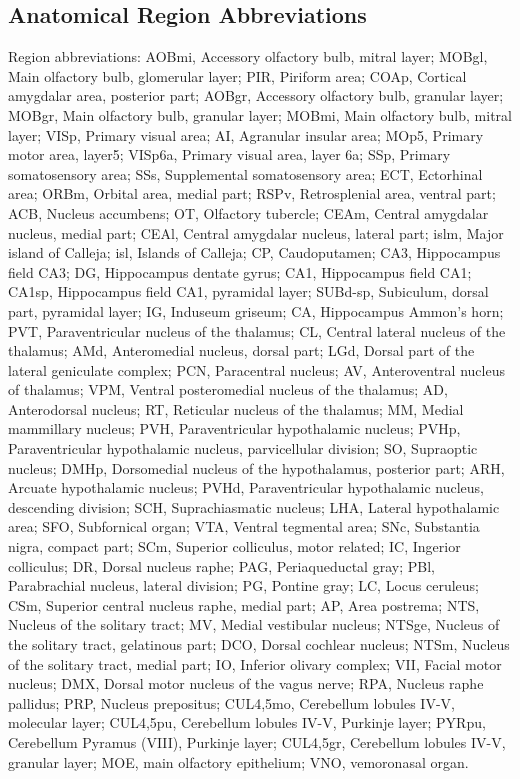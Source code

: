 \subsection{Anatomical Region Abbreviations}
Region abbreviations: AOBmi, Accessory olfactory bulb, mitral layer; MOBgl, Main olfactory bulb, glomerular layer; PIR, Piriform area; COAp, Cortical amygdalar area, posterior part; AOBgr, Accessory olfactory bulb, granular layer; MOBgr, Main olfactory bulb, granular layer; MOBmi, Main olfactory bulb, mitral layer; VISp, Primary visual area; AI, Agranular insular area; MOp5, Primary motor area, layer5; VISp6a, Primary visual area, layer 6a; SSp, Primary somatosensory area; SSs, Supplemental somatosensory area; ECT, Ectorhinal area; ORBm, Orbital area, medial part; RSPv, Retrosplenial area, ventral part; ACB, Nucleus accumbens; OT, Olfactory tubercle; CEAm, Central amygdalar nucleus, medial part; CEAl, Central amygdalar nucleus, lateral part; islm, Major island of Calleja; isl, Islands of Calleja; CP, Caudoputamen; CA3, Hippocampus field CA3; DG, Hippocampus dentate gyrus; CA1, Hippocampus field CA1; CA1sp, Hippocampus field CA1, pyramidal layer; SUBd-sp, Subiculum, dorsal part, pyramidal layer; IG, Induseum griseum; CA, Hippocampus Ammon’s horn; PVT, Paraventricular nucleus of the thalamus; CL, Central lateral nucleus of the thalamus; AMd, Anteromedial nucleus, dorsal part; LGd, Dorsal part of the lateral geniculate complex; PCN, Paracentral nucleus; AV, Anteroventral nucleus of thalamus; VPM, Ventral posteromedial nucleus of the thalamus; AD, Anterodorsal nucleus; RT, Reticular nucleus of the thalamus; MM, Medial mammillary nucleus; PVH, Paraventricular hypothalamic nucleus; PVHp, Paraventricular hypothalamic nucleus, parvicellular division; SO, Supraoptic nucleus; DMHp, Dorsomedial nucleus of the hypothalamus, posterior part; ARH, Arcuate hypothalamic nucleus; PVHd, Paraventricular hypothalamic nucleus, descending division; SCH, Suprachiasmatic nucleus; LHA, Lateral hypothalamic area; SFO, Subfornical organ; VTA, Ventral tegmental area; SNc, Substantia nigra, compact part; SCm, Superior colliculus, motor related; IC, Ingerior colliculus; DR, Dorsal nucleus raphe; PAG, Periaqueductal gray; PBl, Parabrachial nucleus, lateral division; PG, Pontine gray; LC, Locus ceruleus; CSm, Superior central nucleus raphe, medial part; AP, Area postrema; NTS, Nucleus of the solitary tract; MV, Medial vestibular nucleus; NTSge, Nucleus of the solitary tract, gelatinous part; DCO, Dorsal cochlear nucleus; NTSm, Nucleus of the solitary tract, medial part; IO, Inferior olivary complex; VII, Facial motor nucleus; DMX, Dorsal motor nucleus of the vagus nerve; RPA, Nucleus raphe pallidus; PRP, Nucleus prepositus; CUL4,5mo, Cerebellum lobules IV-V, molecular layer; CUL4,5pu, Cerebellum lobules IV-V, Purkinje layer; PYRpu, Cerebellum Pyramus (VIII), Purkinje layer; CUL4,5gr, Cerebellum lobules IV-V, granular layer; MOE, main olfactory epithelium; VNO, vemoronasal organ.








